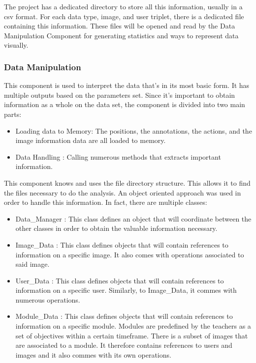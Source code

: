 \documentclass[a4paper,11pt]{report}
\numberwithin{figure}{section} %
\begin{document}
        
        The project has a dedicated directory to store all this information, usually in a csv format.
        For each data type, image, and user triplet, there is a dedicated file containing this information.
        These files will be opened and read by the Data Manipulation Component for generating statistics and ways to represent data visually.
        
        
	\subsubsection{Data Manipulation}
    
    This component is used to interpret the data that's in its most basic form.
    It has multiple outputs based on the parameters set.
    Since it's important to obtain information as a whole on the data set, the component is divided into two main parts:
    \begin{itemize}
        \item[\textbullet] Loading data to Memory: The positions, the annotations, the actions, and the image information data are all loaded to memory.
        \item[\textbullet] Data Handling : Calling numerous methods that extracts important information.
    \end{itemize}

    This component knows and uses the file directory structure.
    This allows it to find the files necessary to do the analysis.
    An object oriented approach was used in order to handle this information.
    In fact, there are multiple classes:

    \begin{itemize}
        \item[\textbullet] Data\_Manager : This class defines an object that will coordinate between the other classes in order to obtain the valuable information necessary.
        \item[\textbullet] Image\_Data : This class defines objects that will contain references to information on a specific image.
        It also comes with operations associated to said image.
        \item[\textbullet] User\_Data : This class defines objects that will contain references to information on a specific user.
        Similarly, to Image\_Data, it commes with numerous operations.
        \item[\textbullet] Module\_Data : This class defines objects that will contain references to information on a specific module.
        Modules are predefined by the teachers as a set of objectives within a certain timeframe.
        There is a subset of images that are associated to a module.
        It therefore contains references to users and images and it also commes with its own operations.
    \end{itemize}
\end{document}
